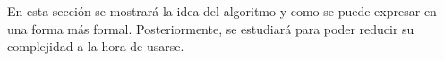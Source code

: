 
En esta sección se mostrará la idea del algoritmo y como se puede expresar en una forma más formal. Posteriormente, se estudiará para poder reducir su complejidad a la hora de usarse.